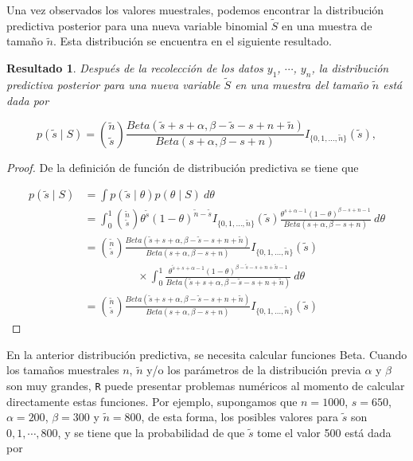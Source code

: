 \documentclass[
  spanish,
]{book}
\newtheorem{proposition}{Resultado}[chapter]
\theoremstyle{definition}
\theoremstyle{definition}
\theoremstyle{definition}
\theoremstyle{definition}
\theoremstyle{remark}
\begin{document}
Una vez observados los valores muestrales, podemos encontrar la
distribución predictiva posterior para una nueva variable binomial
\(\tilde{S}\) en una muestra de tamaño \(\tilde{n}\). Esta distribución se
encuentra en el siguiente resultado.

\begin{proposition}
\protect\hypertarget{prp:ResPredBinom}{}{\label{prp:ResPredBinom} }Después de la recolección de los datos \(y_1\), \(\cdots\), \(y_n\), la distribución predictiva posterior para una nueva variable \(\tilde{S}\) en una muestra del tamaño \(\tilde{n}\) está dada por

\begin{equation}
\label{eq:Binompredict}
p(\tilde{s} \mid S)=\binom{\tilde{n}}{\tilde{s}}\frac{Beta(\tilde{s}+s+\alpha,\beta-\tilde{s}-s+n+\tilde{n})}{Beta(s+\alpha,\beta-s+n)}I_{\{0,1,\ldots,\tilde{n}\}}(\tilde{s}),
\end{equation}
\end{proposition}

\begin{proof}
\iffalse{} {Prueba. } \fi{}De la definición de función de distribución predictiva se tiene que

\begin{align*}
p(\tilde{s} \mid S)&=\int p(\tilde{s} \mid \theta)p(\theta \mid S)\ d\theta\\
&=\int_0^1 \binom{\tilde{n}}{\tilde{s}} \theta^{\tilde{s}}(1-\theta)^{\tilde{n}-\tilde{s}}I_{\{0,1,\ldots,\tilde{n}\}}(\tilde{s})
\frac{\theta^{s+\alpha-1}(1-\theta)^{\beta-s+n-1}}{Beta(s+\alpha,\beta-s+n)}\ d\theta\\
&=\binom{\tilde{n}}{\tilde{s}}\frac{Beta(\tilde{s}+s+\alpha,\beta-\tilde{s}-s+n+\tilde{n})}{Beta(s+\alpha,\beta-s+n)}I_{\{0,1,\ldots,\tilde{n}\}}(\tilde{s})\\
& \hspace{2cm}\times
\int_0^1\frac{\theta^{\tilde{s}+s+\alpha-1}(1-\theta)^{\beta-\tilde{s}-s+n+\tilde{n}-1}}
{Beta(\tilde{s}+s+\alpha,\beta-\tilde{s}-s+n+\tilde{n})}\ d\theta\\
&=\binom{\tilde{n}}{\tilde{s}}\frac{Beta(\tilde{s}+s+\alpha,\beta-\tilde{s}-s+n+\tilde{n})}{Beta(s+\alpha,\beta-s+n)}I_{\{0,1,\ldots,\tilde{n}\}}(\tilde{s})
\end{align*}
\end{proof}

En la anterior distribución predictiva, se necesita calcular funciones
Beta. Cuando los tamaños muestrales \(n\), \(\tilde{n}\) y/o los
parámetros de la distribución previa \(\alpha\) y \(\beta\) son muy grandes,
\texttt{R} puede presentar problemas numéricos al momento de calcular directamente estas funciones. Por ejemplo, supongamos que \(n=1000\), \(s=650\), \(\alpha=200\), \(\beta=300\) y \(\tilde{n}=800\), de esta forma, los posibles
valores para \(\tilde{s}\) son \(0,1,\cdots,800\), y se tiene que la
probabilidad de que \(\tilde{s}\) tome el valor 500 está dada por
\end{document}
